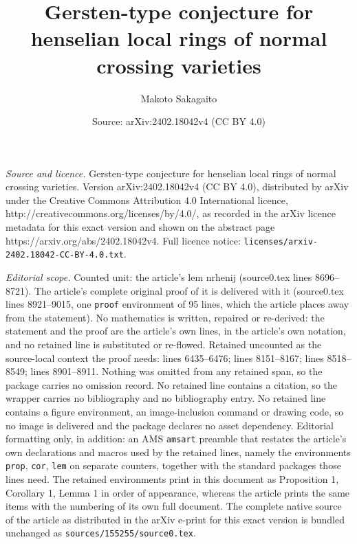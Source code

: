 \documentclass[10pt,a4paper]{amsart}
\title{Gersten-type conjecture for henselian local rings of normal crossing varieties}
\author{Makoto Sakagaito}
\date{Source: arXiv:2402.18042v4 (CC BY 4.0)}
\begin{document}
\maketitle

\noindent\emph{Source and licence.} Gersten-type conjecture for henselian local rings of normal crossing varieties. Version arXiv:2402.18042v4 (CC BY 4.0), distributed by arXiv under the Creative Commons Attribution 4.0 International licence, http://creativecommons.org/licenses/by/4.0/, as recorded in the arXiv licence metadata for this exact version and shown on the abstract page https://arxiv.org/abs/2402.18042v4. Full licence notice: \texttt{licenses/arxiv-2402.18042-CC-BY-4.0.txt}.\par\smallskip

\noindent\textit{Editorial scope.} Counted unit: the article's lem nrhenij (source0.tex lines 8696--8721). The article's complete original proof of it is delivered with it (source0.tex lines 8921--9015, one \texttt{proof} environment of 95 lines, which the article places away from the statement). No mathematics is written, repaired or re-derived: the statement and the proof are the article's own lines, in the article's own notation, and no retained line is substituted or re-flowed.  Retained uncounted as the source-local context the proof needs: lines 6435--6476; lines 8151--8167; lines 8518--8549; lines 8901--8911.  Nothing was omitted from any retained span, so the package carries no omission record.  No retained line contains a citation, so the wrapper carries no bibliography and no bibliography entry.  No retained line contains a figure environment, an image-inclusion command or drawing code, so no image is delivered and the package declares no asset dependency.  Editorial formatting only, in addition: an AMS \texttt{amsart} preamble that restates the article's own declarations and macros used by the retained lines, namely the environments \texttt{prop}, \texttt{cor}, \texttt{lem} on separate counters, together with the standard packages those lines need.  The retained environments print in this document as Proposition 1, Corollary 1, Lemma 1 in order of appearance, whereas the article prints the same items with the numbering of its own full document.  The complete native source of the article as distributed in the arXiv e-print for this exact version is bundled unchanged as \texttt{sources/155255/source0.tex}.
\end{document}
